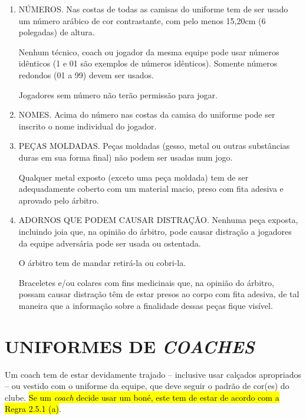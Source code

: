 \begin{enumerate}[label=(\alph*)]
	Os jogadores podem usar calças para \glspl{sliding} de cor sólida e uniforme. uso de calças para \glspl{sliding} não é obrigatório para todos os jogadores, porém, se mais de um jogador estiver usando tal peça, todas elas têm de ser semelhantes em cor e estilo (excetuam-se as almofadas para \glspl{sliding} de uso temporário, com botão de pressão ou velcro).

	Nenhum jogador pode usar calças para \glspl{sliding} que tenham as partes expostas à vista (partes que cobrem as  pernas) desgastadas, desfiadas ou rasgadas.

	\item  NÚMEROS. Nas costas de todas as camisas do uniforme tem de ser usado um número arábico de cor contrastante, com pelo menos 15,20cm (6 polegadas) de altura.

	Nenhum técnico, \gls{coach} ou jogador da mesma equipe pode usar números idênticos (1 e 01 são exemplos de números idênticos).
	Somente  números redondos (01 a 99) devem ser usados.

	Jogadores sem número não terão permissão para jogar.

	\item  NOMES. Acima do número nas costas da camisa do uniforme pode ser inscrito o nome individual do jogador.

	\item  PEÇAS MOLDADAS. Peças moldadas (gesso, metal ou outras substâncias duras em sua forma final) não podem ser usadas num jogo.

	Qualquer metal exposto (exceto uma peça moldada) tem de ser adequadamente coberto com um material macio, preso com fita adesiva e aprovado pelo árbitro.

	\item   ADORNOS QUE PODEM CAUSAR DISTRAÇÃO. Nenhuma peça exposta, incluindo joia que, na opinião do árbitro, pode causar distração a jogadores da  equipe adversária pode ser usada ou ostentada.

	O árbitro tem de mandar retirá-la ou cobri-la.

	Braceletes e/ou colares com fins medicinais que, na opinião do árbitro, possam causar distração têm de estar presos ao corpo com fita adesiva, de tal maneira que a informação sobre a finalidade dessas peças fique visível.

\end{enumerate}


\section{UNIFORMES DE \textit{COACHES}}
Um \gls{coach} tem de estar devidamente trajado -- inclusive usar calçados apropriados -- ou vestido com o uniforme da equipe, que deve seguir o padrão de cor(es) do clube. \hl{Se um \textit{coach} decide usar um bon\'e, este tem de estar de acordo com a Regra 2.5.1 (a)}.

